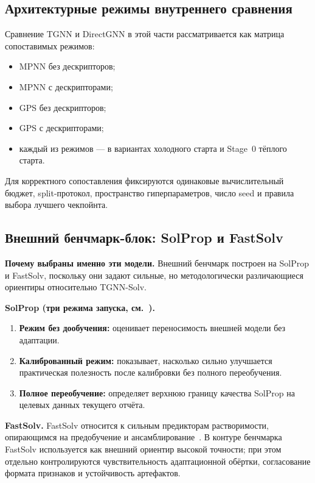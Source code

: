 \documentclass[11pt]{article}
\begin{document}
\subsection{Архитектурные режимы внутреннего сравнения}

Сравнение TGNN и DirectGNN в этой части рассматривается как матрица сопоставимых режимов:
\begin{itemize}
  \item MPNN без дескрипторов;
  \item MPNN с дескрипторами;
  \item GPS без дескрипторов;
  \item GPS с дескрипторами;
  \item каждый из режимов --- в вариантах холодного старта и Stage~0 тёплого старта.
\end{itemize}

Для корректного сопоставления фиксируются одинаковые вычислительный бюджет, split-протокол, пространство гиперпараметров, число seed и правила выбора лучшего чекпойнта.

\subsection{Внешний бенчмарк-блок: SolProp и FastSolv}

\textbf{Почему выбраны именно эти модели.} Внешний бенчмарк построен на SolProp и FastSolv, поскольку они задают сильные, но методологически различающиеся ориентиры относительно TGNN-Solv.

\textbf{SolProp (три режима запуска, см.~\cite{solprop2024}).}
\begin{enumerate}
  \item \textbf{Режим без дообучения:} оценивает переносимость внешней модели без адаптации.
  \item \textbf{Калиброванный режим:} показывает, насколько сильно улучшается практическая полезность после калибровки без полного переобучения.
  \item \textbf{Полное переобучение:} определяет верхнюю границу качества SolProp на целевых данных текущего отчёта.
\end{enumerate}

\textbf{FastSolv.} FastSolv относится к сильным предикторам растворимости, опирающимся на предобучение и ансамблирование~\cite{osanloo2024}. В контуре бенчмарка FastSolv используется как внешний ориентир высокой точности; при этом отдельно контролируются чувствительность адаптационной обёртки, согласование формата признаков и устойчивость артефактов.
\end{document}

